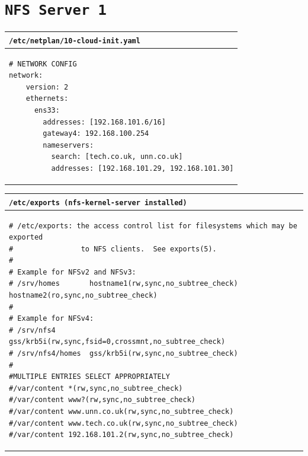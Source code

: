 \documentclass[11pt]{article}
\begin{document}
\clearpage

\section{\texttt{NFS Server 1}}
\begin{table}[ht]
    \begin{tabular}{|p{17.7cm}|} 
        \hline
    \texttt{\textbf{/etc/netplan/10-cloud-init.yaml}}\\ 
        \hline
        \lstset{
                basicstyle=\scriptsize\ttfamily,
        }
            \begin{lstlisting}
# NETWORK CONFIG
network:
    version: 2
    ethernets:
      ens33:
        addresses: [192.168.101.6/16]
        gateway4: 192.168.100.254
        nameservers:
          search: [tech.co.uk, unn.co.uk]
          addresses: [192.168.101.29, 192.168.101.30]
            \end{lstlisting}\\
        \hline
    \end{tabular}
\end{table}

\begin{table}[ht]
    \begin{tabular}{|p{17.7cm}|} 
        \hline
    \texttt{\textbf{/etc/exports (nfs-kernel-server installed)}}\\ 
        \hline
        \lstset{
                basicstyle=\scriptsize\ttfamily,
        }
            \begin{lstlisting}
# /etc/exports: the access control list for filesystems which may be exported
#                to NFS clients.  See exports(5).
#
# Example for NFSv2 and NFSv3:
# /srv/homes       hostname1(rw,sync,no_subtree_check) hostname2(ro,sync,no_subtree_check)
#
# Example for NFSv4:
# /srv/nfs4        gss/krb5i(rw,sync,fsid=0,crossmnt,no_subtree_check)
# /srv/nfs4/homes  gss/krb5i(rw,sync,no_subtree_check)
#
#MULTIPLE ENTRIES SELECT APPROPRIATELY
#/var/content *(rw,sync,no_subtree_check)
#/var/content www?(rw,sync,no_subtree_check)
#/var/content www.unn.co.uk(rw,sync,no_subtree_check)
#/var/content www.tech.co.uk(rw,sync,no_subtree_check)
#/var/content 192.168.101.2(rw,sync,no_subtree_check)
            \end{lstlisting}\\
        \hline
    \end{tabular}
\end{table}

\clearpage
\end{document}
